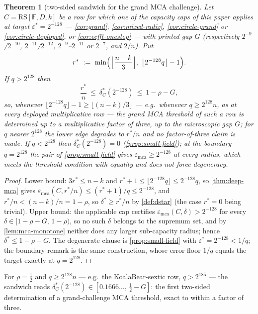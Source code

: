 \documentclass[11pt]{article}
\newtheorem{theorem}{Theorem}[section]
\theoremstyle{definition}
\theoremstyle{remark}
\newcommand{\F}{\mathbb{F}}
\newcommand{\RS}{\mathrm{RS}}
\newcommand{\emca}{\varepsilon_{\mathrm{mca}}}
\begin{document}
\begin{theorem}[two-sided sandwich for the grand MCA challenge]\label{thm:sandwich}
Let $C=\RS[\F,D,k]$ be a row for which one of the capacity caps of this paper applies at target $\varepsilon^*=2^{-128}$ --- \cref{cor:grand}, \cref{cor:mixed-radix}, \cref{cor:circle-grand} or \cref{cor:circle-deployed}, or \cref{cor:ecfft-onestep} --- with printed gap $G$ \textup(respectively $2^{-9}$/$2^{-10}$, $2^{-11}$/$2^{-12}$, $2^{-9}$--$2^{-11}$ or $2^{-7}$, and $2/n$\textup). Put
\[
r^*\ :=\ \min\Bigl(\Bigl\lfloor\frac{n-k}3\Bigr\rfloor,\ \bigl\lfloor2^{-128}q\bigr\rfloor-1\Bigr).
\]
If $q>2^{128}$ then
\[
\frac{r^*}n\ \le\ \delta^*_C(2^{-128})\ \le\ 1-\rho-G ,
\]
so, whenever $\lfloor2^{-128}q\rfloor-1\ge\lfloor(n-k)/3\rfloor$ --- e.g.\ whenever $q\ge2^{128}n$, as at every deployed multiplicative row --- the grand MCA threshold of such a row is determined up to a multiplicative factor of three, up to the microscopic gap $G$; for $q$ nearer $2^{128}$ the lower edge degrades to $r^*/n$ and no factor-of-three claim is made. If $q<2^{128}$ then $\delta^*_C(2^{-128})=0$ \textup(\cref{prop:small-field}\textup); at the boundary $q=2^{128}$ the pair of \cref{prop:small-field} gives $\emca\ge2^{-128}$ at every radius, which meets the threshold condition with equality and does not force degeneracy.
\end{theorem}

\begin{proof}
Lower bound: $3r^*\le n-k$ and $r^*+1\le\lfloor2^{-128}q\rfloor\le2^{-128}q$, so \cref{thm:deep-mca} gives $\emca(C,r^*/n)\le(r^*+1)/q\le2^{-128}$, and $r^*/n<(n-k)/n=1-\rho$, so $\delta^*\ge r^*/n$ by \cref{def:dstar} (the case $r^*=0$ being trivial). Upper bound: the applicable cap certifies $\emca(C,\delta)>2^{-128}$ for every $\delta\in[1-\rho-G,\,1-\rho)$, so no such $\delta$ belongs to the supremum set, and by \cref{lem:mca-monotone} neither does any larger sub-capacity radius; hence $\delta^*\le1-\rho-G$. The degenerate clause is \cref{prop:small-field} with $\varepsilon^*=2^{-128}<1/q$; the boundary remark is the same construction, whose error floor $1/q$ equals the target exactly at $q=2^{128}$.
\end{proof}

For $\rho=\tfrac12$ and $q\ge2^{128}n$ --- e.g.\ the KoalaBear-sextic row, $q>2^{185}$ --- the sandwich reads $\delta^*_C(2^{-128})\in[0.1666\ldots,\,\tfrac12-G]$: the first two-sided determination of a grand-challenge MCA threshold, exact to within a factor of three.
\end{document}
